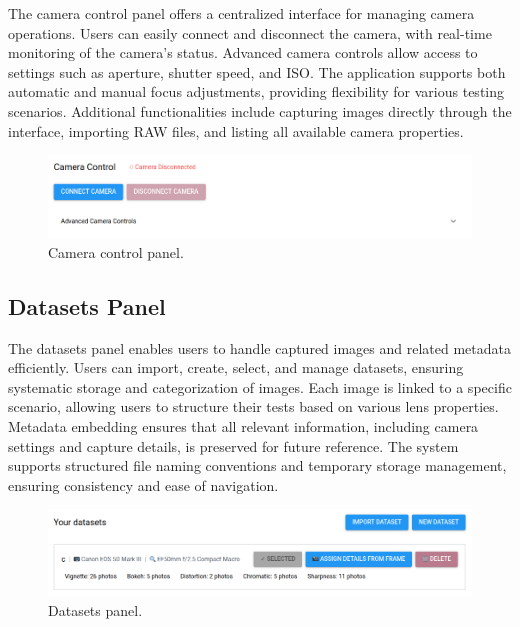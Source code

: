 The camera control panel offers a centralized interface for managing camera operations. Users can easily connect and disconnect the camera, with real-time monitoring of the camera’s status. Advanced camera controls allow access to settings such as aperture, shutter speed, and ISO. The application supports both automatic and manual focus adjustments, providing flexibility for various testing scenarios. Additional functionalities include capturing images directly through the interface, importing RAW files, and listing all available camera properties.

\begin{figure}[h]
\centering
\includegraphics[width=1\textwidth]{Images/camera_control.png}
\caption{Camera control panel.}
\label{fig:ui_camera_control}
\end{figure}

\subsection{Datasets Panel}

The datasets panel enables users to handle captured images and related metadata efficiently. Users can import, create, select, and manage datasets, ensuring systematic storage and categorization of images. Each image is linked to a specific scenario, allowing users to structure their tests based on various lens properties. Metadata embedding ensures that all relevant information, including camera settings and capture details, is preserved for future reference. The system supports structured file naming conventions and temporary storage management, ensuring consistency and ease of navigation.

\begin{figure}[h]
\centering
\includegraphics[width=1\textwidth]{Images/datasets_panel.png}
\caption{Datasets panel.}
\label{fig:ui_datasets}
\end{figure}


